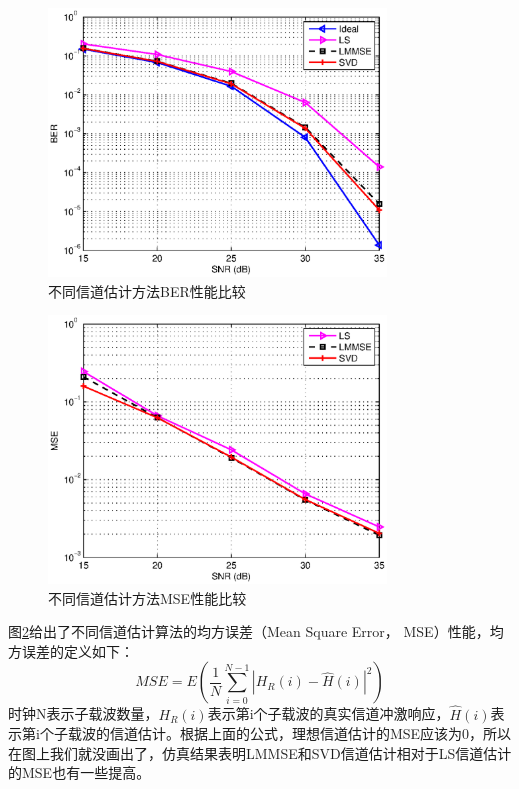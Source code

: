 \begin{figure}[htbp]
\centering
\includegraphics[width=0.8\textwidth]{figures/chapter-3/BER_SNR_avg.eps}
\caption{不同信道估计方法BER性能比较}
\label{fig:BER_SNR_avg}
\end{figure}

\begin{figure}[htbp]
\centering
\includegraphics[width=0.8\textwidth]{figures/chapter-3/MSE_SNR_avg.eps}
\caption{不同信道估计方法MSE性能比较}
\label{fig:MSE_SNR_avg}
\end{figure}
图\ref{fig:MSE_SNR_avg}给出了不同信道估计算法的均方误差（Mean Square Error， MSE）性能，均方误差的定义如下：
\begin{equation}
MSE = E\left(\frac{1}{N}\sum_{i=0}^{N-1}|H_R(i)-\hat{H}(i)|^2\right)
\end{equation}
时钟N表示子载波数量，$H_R(i)$表示第i个子载波的真实信道冲激响应，$\hat{H}(i)$表示第i个子载波的信道估计。根据上面的公式，理想信道估计的MSE应该为0，所以在图上我们就没画出了，仿真结果表明LMMSE和SVD信道估计相对于LS信道估计的MSE也有一些提高。

